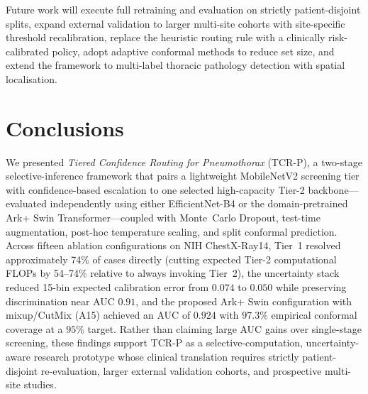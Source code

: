 \documentclass[diagnostics,article,submit,moreauthors]{Definitions/mdpi}
\newcommand{\rev}[1]{#1}
\begin{document}
Future work will execute full retraining and evaluation on strictly patient-disjoint splits, expand external validation to larger multi-site cohorts with site-specific threshold recalibration, replace the heuristic routing rule with a clinically risk-calibrated policy, adopt adaptive conformal methods to reduce set size, and extend the framework to multi-label thoracic pathology detection with spatial localisation.

\section{Conclusions}
\label{sec:conclusion}

We presented \emph{Tiered Confidence Routing for Pneumothorax} (TCR-P), a two-stage selective-inference framework that pairs a lightweight MobileNetV2 screening tier with confidence-based escalation to \rev{one selected high-capacity Tier-2 backbone---evaluated independently using either EfficientNet-B4 or the domain-pretrained Ark+ Swin Transformer---}coupled with Monte~Carlo Dropout, test-time augmentation, post-hoc temperature scaling, and split conformal prediction. Across fifteen ablation configurations on NIH ChestX-Ray14, Tier~1 resolved approximately 74\% of cases directly (cutting expected Tier-2 computational FLOPs by 54--74\% relative to always invoking Tier~2), the uncertainty stack reduced 15-bin expected calibration error from $0.074$ to $0.050$ while preserving discrimination near AUC $0.91$, and the proposed Ark+ Swin configuration with mixup/CutMix (A15) achieved an AUC of $0.924$ with $97.3\%$ empirical conformal coverage at a $95\%$ target. \rev{Rather than claiming large AUC gains over single-stage screening, these findings support TCR-P as a selective-computation, uncertainty-aware research prototype whose clinical translation requires strictly patient-disjoint re-evaluation, larger external validation cohorts, and prospective multi-site studies.}

\vspace{6pt}

\end{document}
